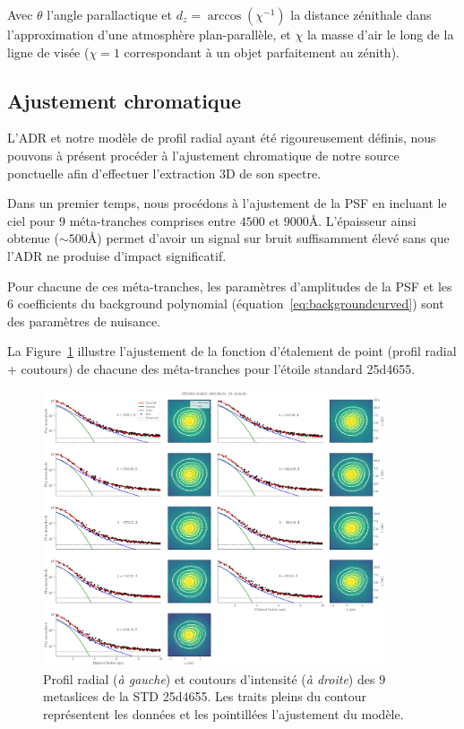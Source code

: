 \documentclass[../main/main.tex]{subfiles}
\begin{document}
Avec $\theta$ l'angle parallactique et $d_{z} = \arccos{\left(\chi^{-1}\right)}$ la
distance zénithale dans l'approximation d'une atmosphère plan-parallèle,
et $\chi$ la masse d'air le long de la ligne de visée ($\chi=1$
correspondant à un objet parfaitement au zénith).


\subsection{Ajustement chromatique}\label{ssec:chrom}

L'ADR et notre modèle de profil radial ayant été rigoureusement définis,
nous pouvons à présent procéder à l'ajustement chromatique de notre
source ponctuelle afin d'effectuer l'extraction 3D de son spectre.

Dans un premier temps, nous procédons à l'ajustement de la PSF en
incluant le ciel pour $9$ méta-tranches comprises entre $4500$ et
$9000$\AA. L'épaisseur ainsi obtenue ($\sim500$\AA) permet d'avoir un
signal sur bruit suffisamment élevé sans que l'ADR ne produise d'impact
significatif.

Pour chacune de ces méta-tranches, les paramètres d'amplitudes de la PSF
et les $6$ coefficients du background polynomial (équation~\ref{eq:backgroundcurved}) sont des paramètres de nuisance.

La Figure~\ref{fig:allmetastd} illustre l'ajustement de la fonction
d'étalement de point (profil radial + coutours) de chacune des méta-tranches pour l'étoile
standard 25d4655.

\begin{figure}[ht]
  \centering
  \includegraphics[width=0.9\textwidth]{../figures/06_irf/STD_profile_allmeta.pdf}
  \caption[Profil radial et coutours des $9$ metaslices de la STD
  25d4655]{Profil radial (\textit{à gauche}) et coutours d'intensité
    (\textit{à droite}) des $9$ metaslices de la STD
    25d4655. Les traits pleins du contour représentent les données et
    les pointillées l'ajustement du modèle.}
  \label{fig:allmetastd}
\end{figure}
\end{document}
